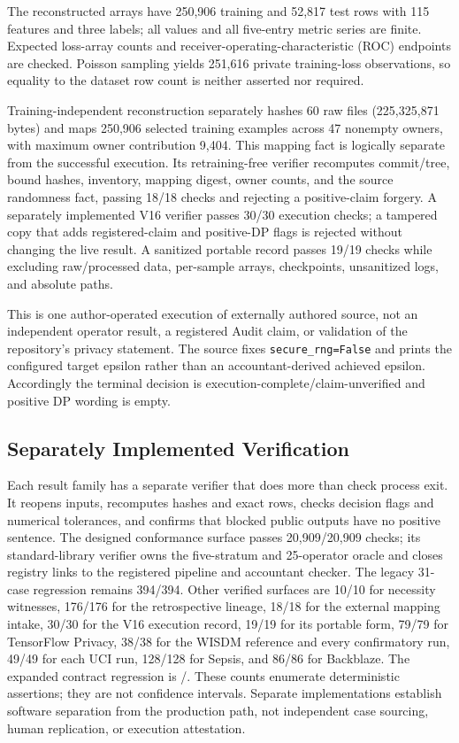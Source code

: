 \documentclass[letterpaper]{article} %
\begin{document}
The reconstructed arrays have 250,906 training and 52,817 test rows with 115
features and three labels; all values and all five-entry metric series are
finite.  Expected loss-array counts and receiver-operating-characteristic
(ROC) endpoints are checked.  Poisson
sampling yields 251,616 private training-loss observations, so equality to the
dataset row count is neither asserted nor required.

Training-independent reconstruction separately hashes 60 raw files
(225,325,871 bytes) and maps 250,906 selected training examples across 47
nonempty owners, with maximum owner contribution 9,404.  This mapping fact
is logically separate from the successful execution.  Its retraining-free
verifier recomputes commit/tree, bound hashes, inventory, mapping digest, owner
counts, and the source randomness fact, passing 18/18 checks and rejecting a
positive-claim forgery.  A separately implemented V16 verifier passes 30/30
execution checks; a tampered copy that adds registered-claim and positive-DP
flags is rejected without changing the live result.  A sanitized portable
record passes 19/19 checks while excluding raw/processed data, per-sample
arrays, checkpoints, unsanitized logs, and absolute paths.

This is one author-operated execution of externally authored source, not an
independent operator result, a registered Audit claim, or validation of the
repository's privacy statement.  The source fixes
\texttt{secure\_rng=False} and prints the configured target epsilon rather
than an accountant-derived achieved epsilon.  Accordingly the terminal
decision is execution-complete/claim-unverified and positive DP wording is
empty.

\subsection{Separately Implemented Verification}

Each result family has a separate verifier that does more than check process
exit.  It reopens inputs, recomputes hashes and exact rows, checks decision
flags and numerical tolerances, and confirms that blocked public outputs have
no positive sentence.  The designed conformance surface passes
20,909/20,909 checks; its standard-library verifier owns the five-stratum and
25-operator oracle and closes registry links to the registered pipeline and
accountant checker.  The legacy 31-case regression remains 394/394.  Other
verified surfaces are 10/10 for necessity witnesses, 176/176 for the
retrospective lineage, 18/18 for the external mapping intake, 30/30 for the
V16 execution record, 19/19 for its portable form, 79/79 for TensorFlow
Privacy, 38/38 for the WISDM reference and every confirmatory run, 49/49 for
each UCI run, 128/128 for Sepsis, and 86/86 for Backblaze.  The expanded
contract regression is \AuditContractTestCount/\AuditContractTestCount.
These counts enumerate deterministic assertions; they are not confidence
intervals.  Separate implementations establish software separation from the
production path, not independent case sourcing, human replication, or
execution attestation.
\end{document}

